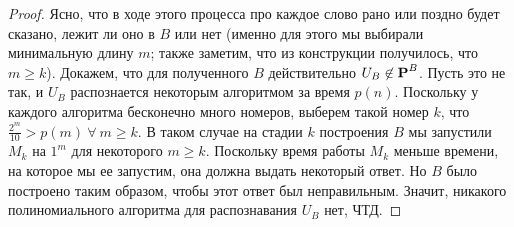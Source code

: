 \begin{proof}
Ясно, что в ходе этого процесса про каждое слово рано или поздно будет сказано, лежит ли оно в $B$ или нет (именно для этого мы выбирали минимальную длину $m$; также заметим, что из конструкции получилось, что $m \geq k$). Докажем, что для полученного $B$ действительно $U_B \not\in \textbf{P}^B$. Пусть это не так, и $U_B$ распознается некоторым алгоритмом за время $p(n)$. Поскольку у каждого алгоритма бесконечно много номеров, выберем такой номер $k$, что $\frac{2^m}{10} > p(m) \ \forall \ m \geq k$. В таком случае на стадии $k$ построения $B$ мы запустили $M_k$ на $1^m$ для некоторого $m \geq k$. Поскольку время работы $M_k$ меньше времени, на которое мы ее запустим, она должна выдать некоторый ответ. Но $B$ было построено таким образом, чтобы этот ответ был неправильным. Значит, никакого полиномиального алгоритма для распознавания $U_B$ нет, ЧТД.
 \end{proof}